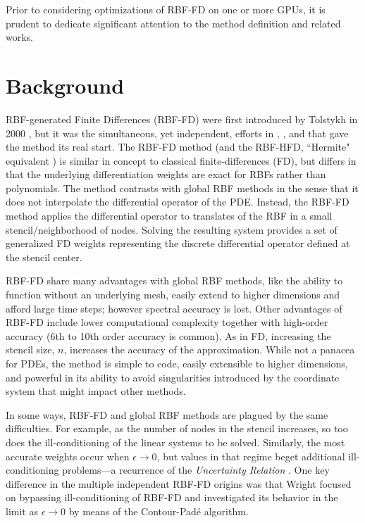 \documentclass[11pt]{report}
\begin{document}
{Prior to considering optimizations of RBF-FD on one or more GPUs, it is prudent to dedicate significant attention to the method definition and related works.



\section{Background}

RBF-generated Finite Differences (RBF-FD) were first introduced by Tolstykh in 2000 \cite{Tolstykh2000}, 
but it was the simultaneous, yet independent,
efforts in \cite{Shu2003}, \cite{Tolstykh2003a}, \cite{Wright2003} and \cite{Cecil2004} that gave the method its real start. 
The RBF-FD method (and the RBF-HFD, ``Hermite" equivalent \cite{WrightFornberg06}) is similar in concept to classical 
finite-differences (FD), but differs in that the underlying differentiation 
weights are exact for RBFs rather than polynomials. The method contrasts with global RBF methods in the sense that it does not interpolate the differential operator of the PDE. Instead, the RBF-FD method applies the differential operator to translates of the RBF in a small stencil/neighborhood of nodes. Solving the resulting system provides a set of generalized FD weights representing the discrete differential operator defined at the stencil center.

RBF-FD 
share many advantages with global RBF methods, 
like the ability to function without an underlying mesh, easily extend to higher dimensions and afford large time steps; however spectral accuracy is lost. 
Other advantages of RBF-FD 
include lower computational complexity together with high-order accuracy
(6th to 10th order accuracy is common). 
As in FD, increasing the stencil size, $n$, increases the accuracy of the approximation. While not a panacea for PDEs, the method is simple to code, easily extensible to higher dimensions, and powerful in its ability to avoid singularities introduced by the coordinate system that might impact other methods. 

In some ways, RBF-FD and global RBF methods are plagued by the same difficulties. For example, as the number of nodes in the stencil increases, so too does the ill-conditioning of the linear systems to be solved. Similarly, the most accurate weights occur when $\epsilon \rightarrow 0$, but values in that regime beget additional ill-conditioning problems---a recurrence of the \emph{Uncertainty Relation} \cite{Schaback1995}. One key difference in the multiple independent RBF-FD origins was that Wright \cite{Wright2003} focused on bypassing ill-conditioning of RBF-FD and investigated its behavior in the limit as $\epsilon \rightarrow 0$ by means of the Contour-Pad\'{e} algorithm. 

}
\end{document}
